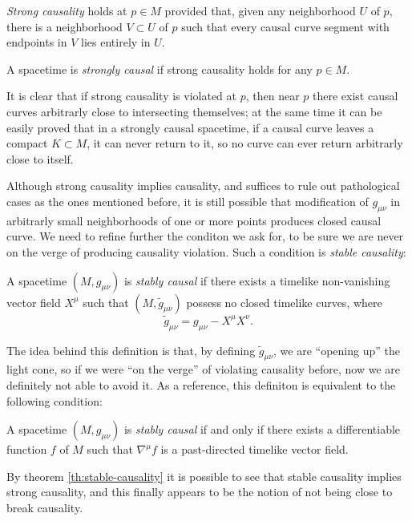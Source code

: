 \begin{definition}
	\emph{Strong causality} holds at \(p\in M\) provided that, given any neighborhood \(U\) of \(p\), there is a neighborhood \(V\subset U\) of \(p\) such that every causal curve segment with endpoints in \(V\) lies entirely in \(U\).

	\noindent A spacetime is \emph{strongly causal} if strong causality holds for any \(p\in M\).
\end{definition}

	It is clear that if strong causality is violated at \(p\), then near \(p\) there exist causal curves arbitrarly close to intersecting themselves; at the same time it can be easily proved that in a strongly causal spacetime, if a causal curve leaves a compact \(K\subset M\), it can never return to it, so no curve can ever return arbitrarly close to itself.

	Although strong causality implies causality, and suffices to rule out pathological cases as the ones mentioned before, it is still possible that modification of \(g_{\mu\nu}\) in arbitrarly small neighborhoods of one or more points produces closed causal curve. We need to refine further the conditon we ask for, to be sure we are never on the verge of producing causality violation. Such a condition is \emph{stable causality}:
	\begin{definition}
		A spacetime \((M, g_{\mu\nu})\) is \emph{stably causal} if there exists a timelike non-vanishing vector field \(X^{\mu}\) such that \((M, \tilde{g}_{\mu\nu})\) possess no closed timelike curves, where
		\[
			\tilde{g}_{\mu\nu}= g_{\mu\nu} - X^{\mu}X^{\nu}.
		\]
	\end{definition}
	The idea behind this definition is that, by defining \(\tilde{g}_{\mu\nu}\), we are ``opening up'' the light cone, so if we were ``on the verge'' of violating causality before, now we are definitely not able to avoid it. As a reference, this definiton is equivalent to the following condition:
	\begin{theorem}
		\label{th:stable-causality}
		A spacetime \((M, g_{\mu\nu})\) is \emph{stably causal} if and only if there exists a differentiable function \(f\) of \(M\) such that \(\nabla^{\mu}f\) is a past-directed timelike vector field.
	\end{theorem}
By theorem \ref{th:stable-causality} it is possible to see that stable causality implies strong causality, and this finally appears to be the notion of not being close to break causality.

